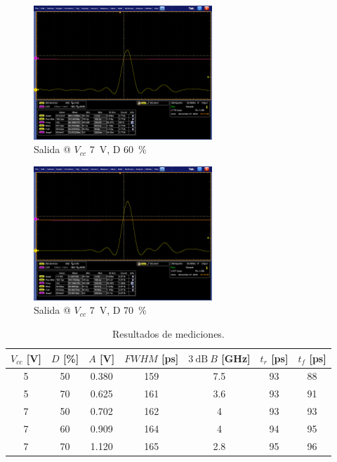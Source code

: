 \begin{figure}
  \centering
    \includegraphics[width=0.6\textwidth]{images/mediciones/vcc_7v_duty_60.png}
    \caption{Salida @ $V_{cc}$ \qty{7}{\volt}, D \qty{60}{\percent} }
    \label{fig:mediciones_7v_60}
\end{figure}

\begin{figure}
  \centering
    \includegraphics[width=0.6\textwidth]{images/mediciones/vcc_7v_duty_70.png}
    \caption{Salida @ $V_{cc}$ \qty{7}{\volt}, D \qty{70}{\percent} }
    \label{fig:mediciones_7v_70}
\end{figure}

\begin{table}
\centering
\begin{tabular}{ccccccc}
\hline
$V_{cc}$ [\unit{\volt}] & $D$ [\unit{\percent}] & $A$ [\unit{\volt}] &
    $FWHM$ [\unit{\pico\second}] & $\qty{3}{\dB} \ B$ [\unit{\giga\hertz}]& $t_r$
    [\unit{\pico\second}]& $t_f$ [\unit{\pico\second}]\\
\hline
5 & 50 & 0.380 & 159 & 7.5 & 93 & 88 \\
5 & 70 & 0.625 & 161 & 3.6 & 93 & 91 \\
7 & 50 & 0.702 & 162 & 4   & 93 & 93 \\
7 & 60 & 0.909 & 164 & 4   & 94 & 95 \\
7 & 70 & 1.120 & 165 & 2.8 & 95 & 96 \\
\hline
\end{tabular}
\caption{Resultados de mediciones.}
\label{tab:mediciones_resultados}
\end{table}

